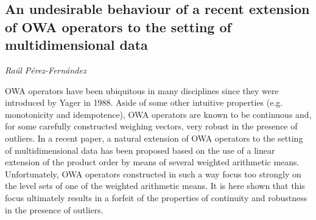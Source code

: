 \documentclass[../booklet.tex]{subfiles}
\begin{document}
\subsection[An undesirable behaviour of a recent extension of OWA operators to the setting of multidimensional data. {\it Raúl Pérez-Fernández}]{An undesirable behaviour of a recent extension of OWA operators to the setting of multidimensional data}

\begin{center}
  {\it Raúl Pérez-Fernández}
\end{center}



OWA operators have been ubiquitous in many disciplines since they were introduced by Yager in 1988. Aside of some other intuitive properties (e.g. monotonicity and idempotence), OWA operators are known to be continuous and, for some carefully constructed weighing vectors, very robust in the presence of outliers. In a recent paper, a natural extension of OWA operators to the setting of multidimensional data has been proposed based on the use of a linear extension of the product order by means of several weighted arithmetic means. Unfortunately, OWA operators constructed in such a way focus too strongly on the level sets of one of the weighted arithmetic means. It is here shown that this focus ultimately results in a forfeit of the properties of continuity and robustness in the presence of outliers. 

\end{document}
